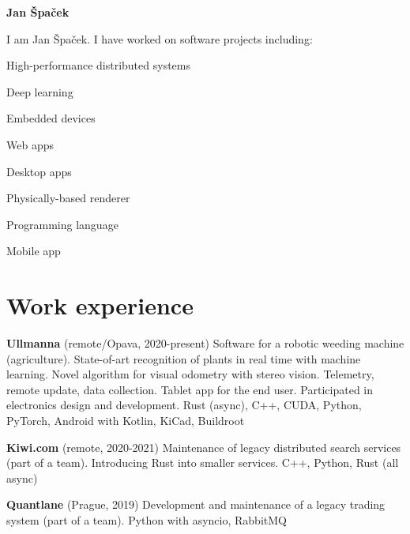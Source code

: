 \documentclass[10pt,a4paper]{article}
\begin{document}
\thispagestyle{empty}
\sffamily

{\bfseries\huge Jan Špaček}

\begin{multicols}{2}

I am Jan Špaček. I have worked on software projects including:
\begin{compactitem}
  \item High-performance distributed systems
  \item Deep learning
  \item Embedded devices
  \item Web apps
  \item Desktop apps
  \item Physically-based renderer
  \item Programming language
  \item Mobile app
\end{compactitem}

\section*{Work experience}

\textbf{Ullmanna} (remote/Opava, 2020-present)
  \newline Software for a robotic weeding machine (agriculture).
  \newline State-of-art recognition of plants in real time with machine learning.
  \newline Novel algorithm for visual odometry with stereo vision.
  \newline Telemetry, remote update, data collection.
  \newline Tablet app for the end user.
  \newline Participated in electronics design and development.
  \newline Rust (async), C++, CUDA, Python, PyTorch, Android with Kotlin, KiCad, Buildroot

\textbf{Kiwi.com} (remote, 2020-2021)
  \newline Maintenance of legacy distributed search services (part of a team).
  \newline Introducing Rust into smaller services.
  \newline C++, Python, Rust (all async)

\textbf{Quantlane} (Prague, 2019)
  \newline Development and maintenance of a legacy trading system (part of a
  team).
  \newline Python with asyncio, RabbitMQ


\end{multicols}
\end{document}

